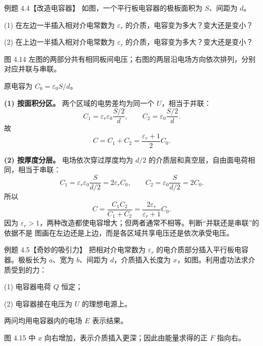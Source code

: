 \begin{origexamplebox}{例题 4.4【改造电容器】}
如图，一个平行板电容器的极板面积为 $S$、间距为 $d$。

(1) 在左边一半插入相对介电常数为 $\varepsilon_r$ 的介质，电容变为多大？变大还是变小？

(2) 在上边一半插入相对介电常数为 $\varepsilon_r$ 的介质，电容变为多大？变大还是变小？
\emModifiedQuestion{}\label{fig:em-modified-question}
\end{origexamplebox}

图 4.14 左图的两部分共有相同板间电压；右图的两层沿电场方向依次排列，分别对应并联与串联。

\modifiedCapacitorFigure
{}

\begin{xesolution}
原电容为 $C_0=\varepsilon_0S/d$。

\textbf{(1) 按面积分区。} 两个区域的电势差均为同一个 $U$，相当于并联：
\[
 C_1=\varepsilon_r\varepsilon_0\frac{S/2}{d},\qquad
 C_2=\varepsilon_0\frac{S/2}{d}.
\]
故
\[
 \boxed{C=C_1+C_2=\frac{\varepsilon_r+1}{2}C_0}.
\]

\textbf{(2) 按厚度分层。} 电场依次穿过厚度均为 $d/2$ 的介质层和真空层，自由面电荷相同，相当于串联：
\[
 C_1=\varepsilon_r\varepsilon_0\frac S{d/2}=2\varepsilon_rC_0,
 \qquad C_2=\varepsilon_0\frac S{d/2}=2C_0.
\]
所以
\[
 \boxed{C=\frac{C_1C_2}{C_1+C_2}
 =\frac{2\varepsilon_r}{\varepsilon_r+1}C_0}.
\]
因为 $\varepsilon_r>1$，两种改造都使电容增大；但两者通常不相等。判断“并联还是串联”的依据不是
图画在左边还是上边，而是各区域共享电压还是依次承受电压。
\end{xesolution}

\begin{origexamplebox}{例题 4.5【奇妙的吸引力】}
把相对介电常数为 $\varepsilon_r$ 的电介质部分插入平行板电容器。极板长为 $a$、宽为 $b$、间距为
$d$，介质插入长度为 $x$，如图。利用虚功法求介质受到的力：

(1) 电容器电荷 $Q$ 恒定；

(2) 电容器接在电压为 $U$ 的理想电源上。

两问均用电容器内的电场 $E$ 表示结果。
\emInsertionQuestion{}\label{fig:em-insertion-question}
\end{origexamplebox}

图 4.15 中 $x$ 向右增加，表示介质插入更深；因此由能量求得的正 $F$ 指向右。

